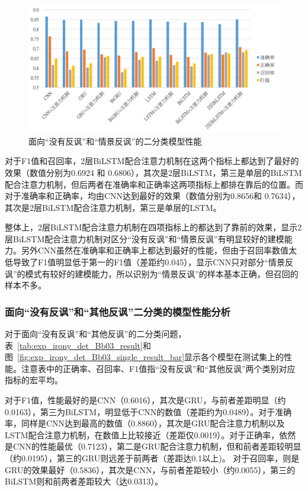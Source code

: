 \begin{figure}[H]
  \centering
  \includegraphics[width=\textwidth]{img/exp_irony_det_Bb02_single_result_bar.png}
  \caption{面向“没有反讽”和“情景反讽”的二分类模型性能}
  \label{fig:exp_irony_det_Bb02_single_result_bar}
\end{figure}

对于F1值和召回率，2层BiLSTM配合注意力机制在这两个指标上都达到了最好的效果（数值分别为0.6924 和 0.6806），其次是2层BiLSTM，第三是单层的BiLSTM配合注意力机制，但后两者在准确率和正确率这两项指标上都排在靠后的位置。而对于准确率和正确率，均由CNN达到最好的效果（数值分别为0.8656和 0.7634），其次是2层BiLSTM配合注意力机制，第三是单层的LSTM。

整体上，2层BiLSTM配合注意力机制在四项指标上的都达到了靠前的效果，显示2层BiLSTM配合注意力机制对区分“没有反讽”和“情景反讽”有明显较好的建模能力。另外CNN虽然在准确率和正确率上都达到最好的性能，但由于召回率数值太低导致了F1值明显低于第一的F1值（差距约0.045），显示CNN只对部分“情景反讽”的模式有较好的建模能力，所以识别为“情景反讽”的样本基本正确，但召回的样本不多。

\subsubsection{面向“没有反讽”和“其他反讽”二分类的模型性能分析}
\label{sssec:exp_irony_det_Bb03_base}

对于面向“没有反讽”和“其他反讽”的二分类问题，表~\ref{tab:exp_irony_det_Bb03_result}和图~\ref{fig:exp_irony_det_Bb03_single_result_bar}显示各个模型在测试集上的性能。注意表中的正确率、召回率、F1值指“没有反讽”和“其他反讽”两个类别对应指标的宏平均。

对于F1值，性能最好的是CNN（0.6016），其次是GRU，与前者差距明显（约0.0163），第三为BiLSTM，明显低于CNN的数值（差距约为0.0489）。对于准确率，同样是CNN达到最高的数值（0.8860），其次是GRU配合注意力机制以及LSTM配合注意力机制，在数值上比较接近（差距仅0.0019）。对于正确率，依然是CNN的性能最优（0.7123），第二是GRU配合注意力机制，但和前者差距较明显（约0.0195），第三的GRU则远差于前两者（差距达0.1以上)。 对于召回率，则是GRU的效果最好（0.5836），其次是CNN，与前者差距较小（约0.0055），第三的BiLSTM则和前两者差距较大（达0.0313）。

